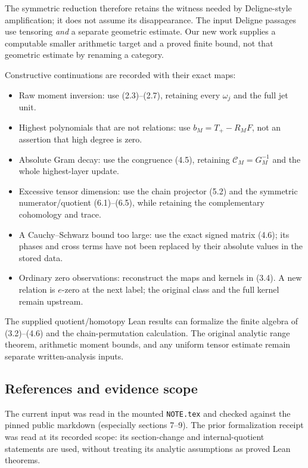 \documentclass[
]{article}
\providecommand{\tightlist}{%
  \setlength{\itemsep}{0pt}\setlength{\parskip}{0pt}}
\begin{document}
The symmetric reduction therefore retains the witness needed by
Deligne-style amplification; it does not assume its disappearance. The
input Deligne passages use tensoring \emph{and} a separate geometric
estimate. Our new work supplies a computable smaller arithmetic target
and a proved finite bound, not that geometric estimate by renaming a
category.

Constructive continuations are recorded with their exact maps:

\begin{itemize}
\tightlist
\item
  Raw moment inversion: use (2.3)--(2.7), retaining every \(\omega_j\)
  and the full jet unit.
\item
  Highest polynomials that are not relations: use \(b_M=T_+-R_MF\), not
  an assertion that high degree is zero.
\item
  Absolute Gram decay: use the congruence (4.5), retaining
  \(\mathcal C_M=G_M^{-1}\) and the whole highest-layer update.
\item
  Excessive tensor dimension: use the chain projector (5.2) and the
  symmetric numerator/quotient (6.1)--(6.5), while retaining the
  complementary cohomology and trace.
\item
  A Cauchy--Schwarz bound too large: use the exact signed matrix (4.6);
  its phases and cross terms have not been replaced by their absolute
  values in the stored data.
\item
  Ordinary zero observations: reconstruct the maps and kernels in (3.4).
  A new relation is \(e\)-zero at the next label; the original class and
  the full kernel remain upstream.
\end{itemize}

The supplied quotient/homotopy Lean results can formalize the finite
algebra of (3.2)--(4.6) and the chain-permutation calculation. The
original analytic range theorem, arithmetic moment bounds, and any
uniform tensor estimate remain separate written-analysis inputs.

\subsection{References and evidence
scope}\label{references-and-evidence-scope}

The current input was read in the mounted \texttt{NOTE.tex} and checked
against the pinned public markdown (especially sections 7--9). The prior
formalization receipt was read at its recorded scope: its section-change
and internal-quotient statements are used, without treating its analytic
assumptions as proved Lean theorems.
\end{document}
